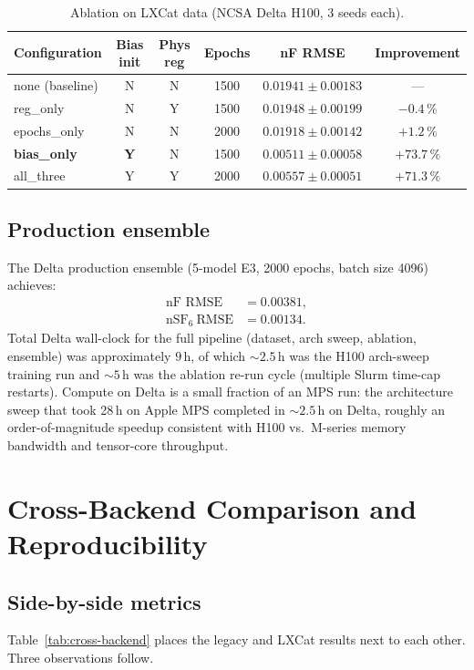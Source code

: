 \documentclass[11pt,a4paper]{article}
\begin{document}
\begin{table}[H]
  \centering
  \caption{Ablation on LXCat data (NCSA Delta H100, 3 seeds each).}
  \label{tab:lxcat-ablation}
  \small
  \begin{tabular}{l c c c c c}
    \toprule
    Configuration & Bias init & Phys reg & Epochs & nF RMSE & Improvement \\
    \midrule
    none (baseline) & N & N & 1500 & $0.01941 \pm 0.00183$ & --- \\
    reg\_only       & N & Y & 1500 & $0.01948 \pm 0.00199$ & $-0.4\,\%$ \\
    epochs\_only    & N & N & 2000 & $0.01918 \pm 0.00142$ & $+1.2\,\%$ \\
    \textbf{bias\_only} & \textbf{Y} & N & 1500 & $\mathbf{0.00511 \pm 0.00058}$ & $\mathbf{+73.7\,\%}$ \\
    all\_three      & Y & Y & 2000 & $0.00557 \pm 0.00051$ & $+71.3\,\%$ \\
    \bottomrule
  \end{tabular}
\end{table}

\subsection{Production ensemble}
The Delta production ensemble (5-model E3, 2000 epochs, batch size
4096) achieves:
\begin{align}
  \text{nF RMSE}              &= 0.00381, \\
  \text{nSF}_6\ \text{RMSE}    &= 0.00134.
\end{align}
Total Delta wall-clock for the full pipeline (dataset, arch sweep,
ablation, ensemble) was approximately $9$\,h, of which $\sim$$2.5$\,h
was the H100 arch-sweep training run and $\sim$$5$\,h was the
ablation re-run cycle (multiple Slurm time-cap restarts).  Compute
on Delta is a small fraction of an MPS run: the architecture sweep
that took 28\,h on Apple MPS completed in $\sim$$2.5$\,h on Delta,
roughly an order-of-magnitude speedup consistent with H100 vs.\
M-series memory bandwidth and tensor-core throughput.

\section{Cross-Backend Comparison and Reproducibility}
\label{sec:reproducibility}

\subsection{Side-by-side metrics}
Table~\ref{tab:cross-backend} places the legacy and LXCat results
next to each other.  Three observations follow.
\end{document}

